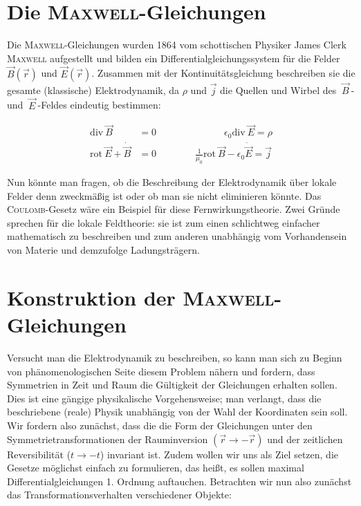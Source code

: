 \section{Die \textsc{Maxwell}-Gleichungen}
Die \textsc{Maxwell}-Gleichungen wurden 1864 vom schottischen Physiker James Clerk \textsc{Maxwell} aufgestellt und bilden ein Differentialgleichungssystem für die Felder  $\vec{B}(\vec{r})$ und $\vec{E}(\vec{r})$. Zusammen mit der Kontinuitätsgleichung beschreiben sie die gesamte (klassische) Elektrodynamik, da $\rho$ und $\vec{j}$ die Quellen und Wirbel des $ \ \vec{B} \ $- und $ \ \vec{E} \ $-Feldes eindeutig bestimmen:

\begin{align*}
\text{div} \ \vec{B} &= 0 \qquad\qquad\qquad\quad \epsilon_0\text{div} \ \vec{E} = \rho \\
\text{rot} \ \vec{E} + \dot{\vec{B}} &= 0 \qquad\qquad \frac{1}{\mu_0}\text{rot} \ \vec{B} - \epsilon_0\dot{\vec{E}} = \vec{j}
\end{align*}


Nun könnte man fragen, ob die  Beschreibung der Elektrodynamik über lokale Felder denn zweckmäßig ist oder ob man sie nicht eliminieren könnte. Das \textsc{Coulomb}-Gesetz wäre ein Beispiel für diese Fernwirkungstheorie. Zwei Gründe sprechen für die lokale Feldtheorie: sie ist zum einen schlichtweg einfacher mathematisch zu beschreiben und zum anderen unabhängig vom Vorhandensein von Materie und demzufolge Ladungsträgern.

\section{Konstruktion der \textsc{Maxwell}-Gleichungen}
Versucht man die Elektrodynamik zu beschreiben, so kann man sich zu Beginn von phänomenologischen Seite diesem Problem nähern und fordern, dass Symmetrien in Zeit und Raum die Gültigkeit der Gleichungen erhalten sollen. Dies ist eine gängige physikalische Vorgehensweise; man verlangt, dass die beschriebene (reale) Physik unabhängig von der Wahl der Koordinaten sein soll.
Wir fordern also zunächst, dass die die Form der Gleichungen unter den Symmetrietransformationen der Rauminversion $(\vec{r}\rightarrow-\vec{r})$ und der zeitlichen Reversibilität ($t\rightarrow-t$) invariant ist. Zudem wollen wir uns als Ziel setzen, die Gesetze möglichst einfach zu formulieren, das heißt, es sollen maximal Differentialgleichungen 1. Ordnung auftauchen.
Betrachten wir nun also zunächst das Transformationsverhalten verschiedener Objekte:\ \\
\ \\


